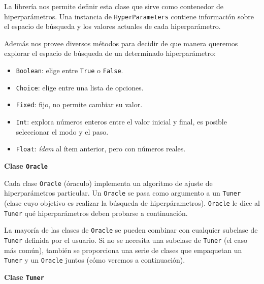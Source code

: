 \documentclass[a4paper,12pt]{article}
\begin{document}
La librería nos permite definir esta clase que sirve como contenedor de hiperparámetros. Una instancia de \texttt{HyperParameters} contiene información sobre el espacio de búsqueda y los valores actuales de cada hiperparámetro.

Además nos provee diversos métodos para decidir de que manera queremos explorar el espacio de búsqueda de un determinado hiperparámetro:

\begin{itemize}
	\item \texttt{Boolean}: elige entre \texttt{True} o \texttt{False}.
	\item \texttt{Choice}: elige entre una lista de opciones.
	\item \texttt{Fixed}: fijo, no permite cambiar su valor.
	\item \texttt{Int}: explora números enteros entre el valor inicial y final, es posible seleccionar el modo y el paso.
	\item \texttt{Float}: \textit{ídem} al ítem anterior, pero con números reales.
\end{itemize}

\textbf{Clase \texttt{Oracle}}

Cada clase \texttt{Oracle} (óraculo) implementa un algoritmo de ajuste de hiperparámetros particular. Un \texttt{Oracle} se pasa como argumento a un \texttt{Tuner} (clase cuyo objetivo es realizar la búsqueda de hiperpárametros). \texttt{Oracle} le dice al \texttt{Tuner} qué hiperparámetros deben probarse a continuación.

La mayoría de las clases de \texttt{Oracle} se pueden combinar con cualquier subclase de \texttt{Tuner} definida por el usuario. Si no se necesita una subclase de \texttt{Tuner} (el caso más común), también se proporciona una serie de clases que empaquetan un \texttt{Tuner} y un \texttt{Oracle} juntos (cómo veremos a continuación).

\textbf{Clase \texttt{Tuner}}
\end{document}
